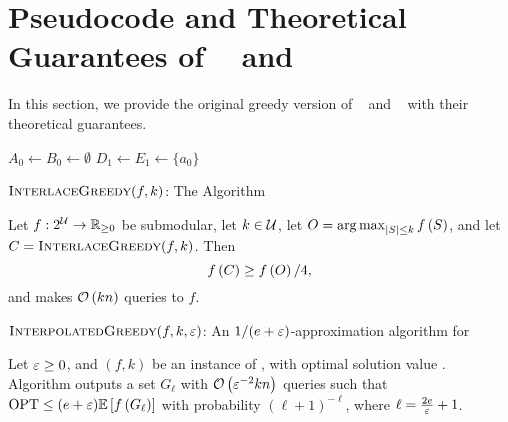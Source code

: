 \section{Pseudocode and Theoretical Guarantees of \ig~\citep{DBLP:conf/nips/Kuhnle19} and \itg~\citep{DBLP:conf/kdd/ChenK23}}\label{apx:pseudocode}
In this section, we provide the original greedy version of 
\ig~\citep{DBLP:conf/nips/Kuhnle19} and \itg~\citep{DBLP:conf/kdd/ChenK23}
with their theoretical guarantees.
\begin{algorithm}[ht]
    $A_0\gets B_0 \gets \emptyset$\;
    $D_1 \gets E_1 \gets \{a_0\}$\;
    \caption{$\textsc{InterlaceGreedy}(f,k)$: The \ig Algorithm~\citep{DBLP:conf/nips/Kuhnle19}}
    \label{alg:ig}
\end{algorithm}
\begin{theorem}
Let $f:2^{\mathcal U} \to \mathbb{R}_{\ge 0}$ be submodular, let $k\in \mathcal U$,
let $O = \operatorname*{arg\,max}_{|S|\le k} f \left( S \right)$,
and let $C = \textsc{InterlaceGreedy}(f, k)$. Then
\[f \left( C \right) \ge f \left( O \right)/4,\]
and \ig makes $\mathcal O \left( kn \right)$ queries to $f$.
\end{theorem}

\begin{algorithm}[ht]
    \;
    \caption{$\textsc{InterpolatedGreedy}(f,k,\varepsilon)$: An $1/(e+\varepsilon)$-approximation algorithm for \sm}
    \label{alg:itg}
\end{algorithm}
\begin{theorem}
Let $\varepsilon \ge 0$, and $(f, k)$ be an instance of \sm, 
with optimal solution value \opt.
Algorithm \itg outputs a set $G_\ell$ with $\mathcal O \left( \varepsilon^{-2}kn \right)$ queries
such that $\text{OPT} \le (e+\varepsilon)\mathbb{E}\left[ f \left( G_\ell \right) \right]$ with 
probability $(\ell+1)^{-\ell}$, where $\ell = \frac{2e}{\varepsilon}+1$.
\end{theorem}


